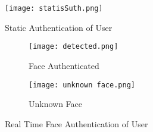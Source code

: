 \documentclass{article}
\begin{document}
\begin{figure}[htbp]
\begin{center} 
\smallskip
\centering
	\texttt{[image: statisSuth.png]}
	\caption{Static Authentication of User}
	\label{fig:label1}




\end{center}
\end{figure}
\bigskip



\begin{figure}[htbp]
\begin{subfigure}[b]{0.4\textwidth}   
	\centering
	\texttt{[image: detected.png]}
	\caption{Face Authenticated}
	\label{fig:label1}
\end{subfigure}%
\begin{subfigure}[b]{0.8\textwidth}   
\centering
	\texttt{[image: unknown face.png]}
	\caption{Unknown Face}
	\label{fig:label2}
\end{subfigure}%
\bigskip


\caption{Real Time Face Authentication of User}
\label{fig:subs}
\end{figure}
\end{document}
